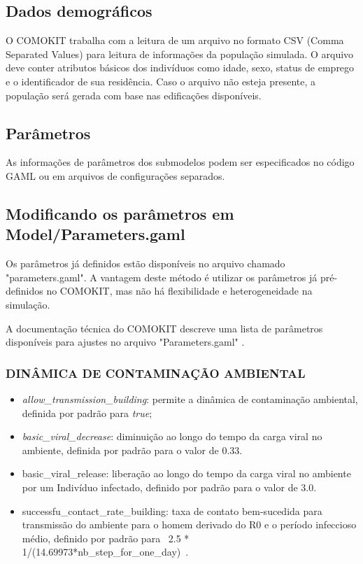 \subsection{Dados demográficos}

O COMOKIT trabalha com a leitura de um arquivo no formato CSV (Comma Separated Values) para leitura de informações da população simulada. O arquivo deve conter atributos básicos dos indivíduos como idade, sexo, status de emprego e o identificador de sua residência. Caso o arquivo não esteja presente, a população será gerada com base nas edificações disponíveis.


\subsection{Parâmetros}

As informações de parâmetros dos submodelos podem ser especificados no código
GAML ou em arquivos de configurações separados.

\subsection{Modificando os parâmetros em Model/Parameters.gaml}

Os parâmetros já definidos estão disponíveis no arquivo chamado "parameters.gaml". A vantagem deste método é utilizar os parâmetros já pré-definidos no COMOKIT, mas não há flexibilidade e heterogeneidade na simulação.

A documentação técnica do COMOKIT descreve uma lista de parâmetros disponíveis para ajustes no arquivo "Parameters.gaml" \cite{ParametrosCOMOKIT:online}.

\subsubsection{DINÂMICA DE CONTAMINAÇÃO AMBIENTAL}

\begin{itemize}
\item \textit{allow\_transmission\_building}: permite a dinâmica de contaminação ambiental, definida por padrão para \textit{true};
\item \textit{basic\_viral\_decrease}: diminuição ao longo do tempo da carga viral no ambiente, definida por padrão para o valor de 0.33.
\item {basic\_viral\_release}: liberação ao longo do tempo da carga viral no ambiente por um Indivíduo infectado, definido por padrão para o valor de 3.0.
\item {successfu\_contact\_rate\_building}: taxa de contato bem-sucedida para transmissão do ambiente para o homem derivado do R0 e o período infeccioso médio, definido por padrão para \ 2.5 * 1/(14.69973*{nb\_step\_for\_one\_day})\ .
\end{itemize}

